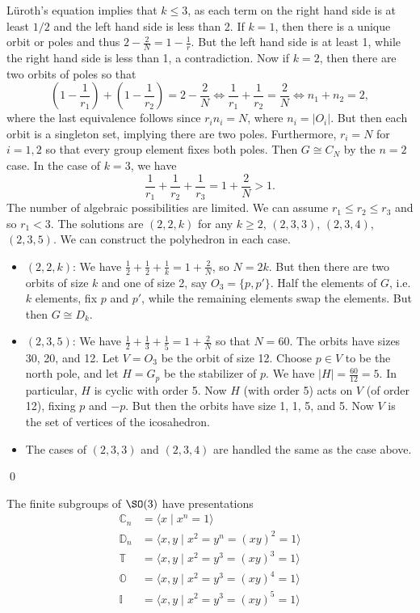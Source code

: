 L\"uroth's equation implies that $k \leq 3$, as each term on the right hand side is at least $1/2$ and the left hand side is less than 2. If $k=1$, then there is a unique orbit or poles and thus $2- \frac{2}{N}= 1- \frac{1}{r}$. But the left hand side is at least 1, while the right hand side is less than 1, a contradiction. Now if $k=2$, then there are two orbits of poles so that
	\[
	\left(1-\dfrac{1}{r_1}\right) + \left(1-\dfrac{1}{r_2}\right)= 2-\dfrac{2}{N} \Longleftrightarrow \dfrac{1}{r_1} + \dfrac{1}{r_2} = \dfrac{2}{N} \Longleftrightarrow n_1+n_2 =2,
	\]
where the last equivalence follows since $r_in_i=N$, where $n_i=|O_i|$. But then each orbit is a singleton set, implying there are two poles. Furthermore, $r_i=N$ for $i=1,2$ so that every group element fixes both poles. Then $G \cong C_N$ by the $n=2$ case. In the case of $k=3$, we have
	\[
	\dfrac{1}{r_1} + \dfrac{1}{r_2} + \dfrac{1}{r_3} = 1 + \dfrac{2}{N}>1.
	\]
The number of algebraic possibilities are limited. We can assume $r_1 \leq r_2 \leq r_3$ and so $r_1<3$. The solutions are $(2,2,k)$ for any $k \geq 2$, $(2,3,3)$, $(2,3,4)$, $(2,3,5)$. We can construct the polyhedron in each case. 
	\begin{itemize}
	\item  $(2,2,k)$: \enskip We have $\frac{1}{2}+\frac{1}{2}+\frac{1}{k}=1+\frac{2}{N}$, so $N=2k$. But then there are two orbits of size $k$ and one of size 2, say $O_3=\{p,p' \}$. Half the elements of $G$, i.e. $k$ elements, fix $p$ and $p'$, while the remaining elements swap the elements. But then $G \cong D_k$.  
	\item $(2,3,5)$: \enskip We have $\frac{1}{2}+\frac{1}{3}+\frac{1}{5}=1+\frac{2}{N}$ so that $N=60$. The orbits have sizes 30, 20, and 12. Let $V=O_3$ be the orbit of size 12. Choose $p \in V$ to be the north pole, and let $H=G_p$ be the stabilizer of $p$. We have $|H|= \frac{60}{12}=5$. In particular, $H$ is cyclic with order 5. Now $H$ (with order 5) acts on $V$ (of order 12), fixing $p$ and $-p$. But then the orbits have size 1, 1, 5, and 5. Now $V$ is the set of vertices of the icosahedron. 
	\item The cases of $(2,3,3)$ and $(2,3,4)$ are handled the same as the case above. 
	\end{itemize}
\qed \\


\begin{cor}
The finite subgroups of $\SO(3)$ have presentations 
	\[
	\begin{split}
	\mathbb{C}_n&= \langle x \;|\; x^n=1 \rangle \\
	\mathbb{D}_n&= \langle x,y \;|\; x^2=y^n=(xy)^2=1 \rangle \\
	\mathbb{T}&= \langle x,y \;|\; x^2=y^3=(xy)^3=1 \rangle \\
	\mathbb{O}&= \langle x,y \;|\; x^2=y^3=(xy)^4=1 \rangle \\
	\mathbb{I}&= \langle x,y \;|\; x^2=y^3=(xy)^5=1 \rangle
	\end{split}
	\]
\end{cor}

